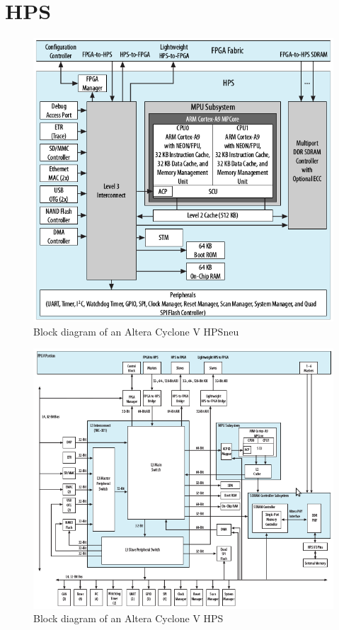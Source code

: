 \section{HPS}
\begin{figure}[htbp]
\begin{center}
\includegraphics[width=15cm,keepaspectratio=true]{bilder/png/AlteraHPSneu}
\caption{Block diagram of an Altera Cyclone V HPSneu\cite{altcycvov15}}
\label{fig:alterahpsblocksneu}
\end{center}
\end{figure}
\begin{figure}[htbp]
\begin{center}
\includegraphics[width=15cm,keepaspectratio=true]{bilder/png/AlteraHPS}
\caption{Block diagram of an Altera Cyclone V HPS\cite[chapter 1]{AlteraHPS15}}
\label{fig:alterahpsblocks}
\end{center}
\end{figure}
